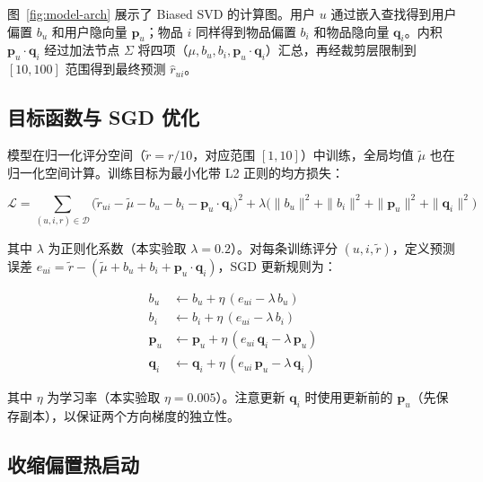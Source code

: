 \documentclass[UTF8,a4paper,10pt]{ctexart}
\begin{document}
\begin{tcolorbox}[colback=blue!3!white,colframe=blue!55!black,title=模型设计说明]
  \hspace{2em}图~\ref{fig:model-arch} 展示了 Biased SVD 的计算图。用户 $u$ 通过嵌入查找得到用户偏置 $b_u$ 和用户隐向量 $\mathbf{p}_u$；物品 $i$ 同样得到物品偏置 $b_i$ 和物品隐向量 $\mathbf{q}_i$。内积 $\mathbf{p}_u\cdot\mathbf{q}_i$ 经过加法节点 $\Sigma$ 将四项（$\mu, b_u, b_i, \mathbf{p}_u\cdot\mathbf{q}_i$）汇总，再经裁剪层限制到 $[10, 100]$ 范围得到最终预测 $\hat{r}_{ui}$。
\end{tcolorbox}

\subsection{目标函数与 SGD 优化}

模型在归一化评分空间（$\tilde{r} = r / 10$，对应范围 $[1, 10]$）中训练，全局均值 $\tilde{\mu}$ 也在归一化空间计算。训练目标为最小化带 L2 正则的均方损失：

\begin{equation}
  \mathcal{L} = \sum_{(u,i,r)\in\mathcal{D}} \bigl(\tilde{r}_{ui} - \tilde{\mu} - b_u - b_i - \mathbf{p}_u\cdot\mathbf{q}_i\bigr)^2
  + \lambda\bigl(\|b_u\|^2 + \|b_i\|^2 + \|\mathbf{p}_u\|^2 + \|\mathbf{q}_i\|^2\bigr)
  \label{eq:loss}
\end{equation}

其中 $\lambda$ 为正则化系数（本实验取 $\lambda = 0.2$）。对每条训练评分 $(u, i, \tilde{r})$，定义预测误差 $e_{ui} = \tilde{r} - (\tilde{\mu} + b_u + b_i + \mathbf{p}_u\cdot\mathbf{q}_i)$，SGD 更新规则为：

\begin{align}
  b_u &\leftarrow b_u + \eta\,(e_{ui} - \lambda\,b_u) \label{eq:update-bu}\\
  b_i &\leftarrow b_i + \eta\,(e_{ui} - \lambda\,b_i) \label{eq:update-bi}\\
  \mathbf{p}_u &\leftarrow \mathbf{p}_u + \eta\,(e_{ui}\,\mathbf{q}_i - \lambda\,\mathbf{p}_u) \label{eq:update-pu}\\
  \mathbf{q}_i &\leftarrow \mathbf{q}_i + \eta\,(e_{ui}\,\mathbf{p}_u - \lambda\,\mathbf{q}_i) \label{eq:update-qi}
\end{align}

其中 $\eta$ 为学习率（本实验取 $\eta = 0.005$）。注意更新 $\mathbf{q}_i$ 时使用更新前的 $\mathbf{p}_u$（先保存副本），以保证两个方向梯度的独立性。

\subsection{收缩偏置热启动}
\end{document}
